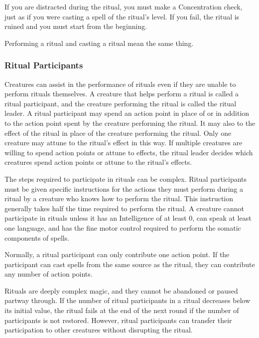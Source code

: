         If you are distracted during the ritual, you must make a Concentration check, just as if you were casting a spell of the ritual's level.
        If you fail, the ritual is ruined and you must start from the beginning.
        \par Performing a ritual and casting a ritual mean the same thing.

        \subsubsection{Ritual Participants}
            Creatures can assist in the performance of rituals even if they are unable to perform rituals themselves.
            A creature that helps perform a ritual is called a ritual participant, and the creature performing the ritual is called the ritual leader.
            A ritual participant may spend an action point in place of or in addition to the action point spent by the creature performing the ritual.
            It may also  to the effect of the ritual in place of the creature performing the ritual.
            Only one creature may attune to the ritual's effect in this way.
            If multiple creatures are willing to spend action points or attune to effects, the ritual leader decides which creatures spend action points or attune to the ritual's effects.

            The steps required to participate in rituals can be complex.
            Ritual participants must be given specific instructions for the actions they must perform during a ritual by a creature who knows how to perform the ritual.
            This instruction generally takes half the time required to perform the ritual.
            A creature cannot participate in rituals unless it has an Intelligence of at least 0, can speak at least one language, and has the fine motor control required to perform the somatic components of spells.

            Normally, a ritual participant can only contribute one action point.
            If the participant can cast spells from the same source as the ritual, they can contribute any number of action points.

            Rituals are deeply complex magic, and they cannot be abandoned or paused partway through.
            If the number of ritual participants in a ritual decreases below its initial value, the ritual fails at the end of the next round if the number of participants is not restored.
            However, ritual participants can transfer their participation to other creatures without disrupting the ritual.

